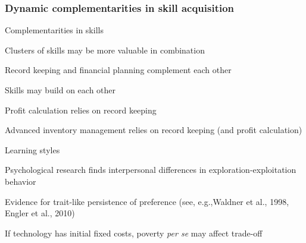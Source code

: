\documentclass[hideothersubsections, usenames,dvipsnames,11pt]{beamer}
\newenvironment{itemize_2pt}{\itemize\addtolength{\itemsep}{2pt}}{\enditemize}
\begin{document}
\begin{frame}
\frametitle{Dynamic complementarities in skill acquisition}

Complementarities in skills
\begin{itemize_2pt}
	\item Clusters of skills may be more valuable in combination
	\begin{itemize_2pt}
		\item Record keeping and financial planning complement each other
	\end{itemize_2pt}
	\item Skills may build on each other
	\begin{itemize_2pt}
		\item Profit calculation relies on record keeping
		\item Advanced inventory management relies on record keeping (and profit calculation)
	\end{itemize_2pt}
\end{itemize_2pt}

\vspace{1.0em}

Learning styles
\begin{itemize_2pt}
	\item Psychological research finds interpersonal differences in \textcolor{bdf}{exploration-exploitation behavior} 
	\begin{itemize_2pt}
		\item Evidence for trait-like persistence of preference (see, e.g.,\textcolor{camel}{Waldner et al., 1998, Engler et al., 2010})%
		\item If technology has initial fixed costs, poverty \textit{per se} may affect trade-off
	\end{itemize_2pt}
	
\end{itemize_2pt}

\end{frame}
\end{document}
